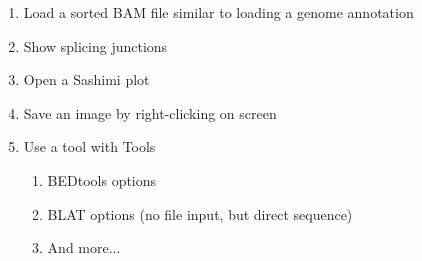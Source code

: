 \begin{enumerate}
\begin{enumerate}
\begin{figure}[ht]
{      }
    \end{figure}
    \pagebreak
  \end{enumerate}
\item Load a sorted BAM file similar to loading a genome annotation
\item Show splicing junctions
  \begin{figure}[ht]
    \centering
  \end{figure}
\item Open a Sashimi plot
  \begin{figure}[ht]
    \centering
  \end{figure}
  \pagebreak
\item Save an image by right-clicking on screen
\item Use a tool with Tools
  \begin{enumerate}
  \item BEDtools options
  \item BLAT options (no file input, but direct sequence)
  \item And more...

\end{enumerate}
\end{enumerate}
